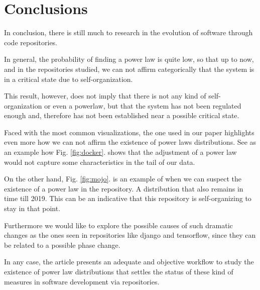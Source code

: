\documentclass[conference]{IEEEtran}
\begin{document}


\section{Conclusions}\label{conc}



In conclusion, there is still much to research in the evolution of software through code repositories.  %

In general, the probability of finding a power law is quite low, so that up to now, and in the repositories studied, we can not affirm categorically that the system is in a critical state due to self-organization.

This result, however, does not imply that there is not any kind of self-organization or even a powerlaw, but that the system has not been regulated enough and, therefore has not been established near a possible critical state.

Faced with the most common visualizations, the one used in our paper highlights even more how we can not affirm the existence of power laws distributions. See as an example how Fig. \ref{fig:docker}. shows that the adjustment of a power law would not capture some characteristics in the tail of our data. 

On the other hand, Fig. \ref{fig:mojo}. is an example of when we can suspect the existence of a power law in the repository. A distribution that also remains in time till 2019. This can be an indicative that this repository is self-organizing to stay in that point.

Furthermore we would like to explore the possible causes of such dramatic changes as the ones seen in repositories like django and tensorflow, since they can be related to a possible phase change.

In any case, the article presents an adequate and objective workflow to study the existence of power law distributions that settles the status of these kind of measures in software development via repositories.
\end{document}
